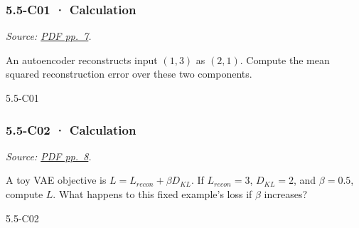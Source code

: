 \noindent\begin{minipage}{\linewidth}

\subsubsection{5.5-C01 · Calculation}\label{c01-calculation-16}

\emph{Source:
\href{../Lecture\%20Slides/5.5.\%20Generative\%20Models.pdf\#page=7}{PDF
pp.~7}.}

An autoencoder reconstructs input \((1,3)\) as \((2,1)\). Compute the
mean squared reconstruction error over these two components.

\begin{solution}[26mm]{5.5-C01}

\end{solution}
\end{minipage}\par\medskip

\noindent\begin{minipage}{\linewidth}

\subsubsection{5.5-C02 · Calculation}\label{c02-calculation-16}

\emph{Source:
\href{../Lecture\%20Slides/5.5.\%20Generative\%20Models.pdf\#page=8}{PDF
pp.~8}.}

A toy VAE objective is \(L=L_{recon}+\beta D_{KL}\). If \(L_{recon}=3\),
\(D_{KL}=2\), and \(\beta=0.5\), compute \(L\). What happens to this
fixed example's loss if \(\beta\) increases?

\begin{solution}[26mm]{5.5-C02}

\end{solution}
\end{minipage}\par\medskip

